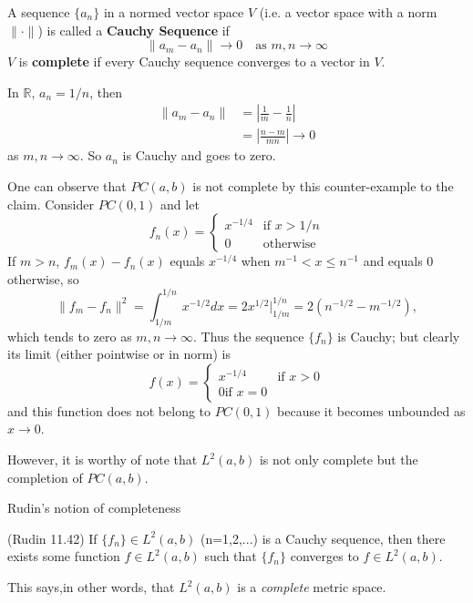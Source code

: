 \begin{defn}
A sequence $\{a_{n}\}$ in a normed vector space $V$ (i.e. a
vector space with a norm $\|\cdot\|$) is called a
\textbf{Cauchy Sequence} 
if
\begin{equation}
\|a_m-a_n\|\to 0\quad \text{as }m,n\to\infty
\end{equation}
$V$ is \textbf{complete}
if every Cauchy sequence
converges to a vector in $V$.
\end{defn}
\begin{ex}
In $\mathbb{R}$, $a_n=1/n$, then
\begin{align*}
\|a_m - a_n\| &= \left|\frac{1}{m}-\frac{1}{n}\right| \\
&= \left|\frac{n-m}{mn}\right|\to 0
\end{align*}
as $m,n\to\infty$. So $a_n$ is Cauchy and goes to zero.
\end{ex}
One can observe that $PC(a,b)$ is not complete by this
counter-example to the claim. Consider $PC(0,1)$ and let
\begin{equation}
f_{n}(x) = \begin{cases} x^{-1/4}&\text{if }x>1/n\\
0&\text{otherwise}\end{cases}
\end{equation}
If $m>n$, $f_m(x)-f_n(x)$ equals $x^{-1/4}$ when
$m^{-1}<x\leq n^{-1}$ and equals 0 otherwise, so
\begin{equation}
\|f_m - f_n\|^2 = \int^{1/n}_{1/m}x^{-1/2}dx =
2x^{1/2}|^{1/n}_{1/m} = 2(n^{-1/2}-m^{-1/2}),
\end{equation}
which tends to zero as $m,n\to\infty$. Thus the sequence
$\{f_n\}$ is Cauchy; but clearly its limit (either pointwise
or in norm) is
\begin{equation}
f(x) =\begin{cases} x^{-1/4}&\text{if }x>0\\
0\text{if }x=0\end{cases}
\end{equation}
and this function does not belong to $PC(0,1)$ because it
becomes unbounded as $x\to 0$.

However, it is worthy of note that $L^{2}(a,b)$ is not only
complete but the completion of $PC(a,b)$.

Rudin's notion of completeness~\cite{rudinPrinciplesOfMathematicalAnalysis}
\begin{thm}{(Rudin 11.42)}
If $\{f_{n}\}\in L^{2}(a,b)$ (n=1,2,...) is a Cauchy
sequence, then there exists some function $f\in L^{2}(a,b)$
such that $\{f_{n}\}$ converges to $f \in L^{2}(a,b)$.
\end{thm}
This says,in other words, that $L^{2}(a,b)$ is a
\emph{complete} metric space.


